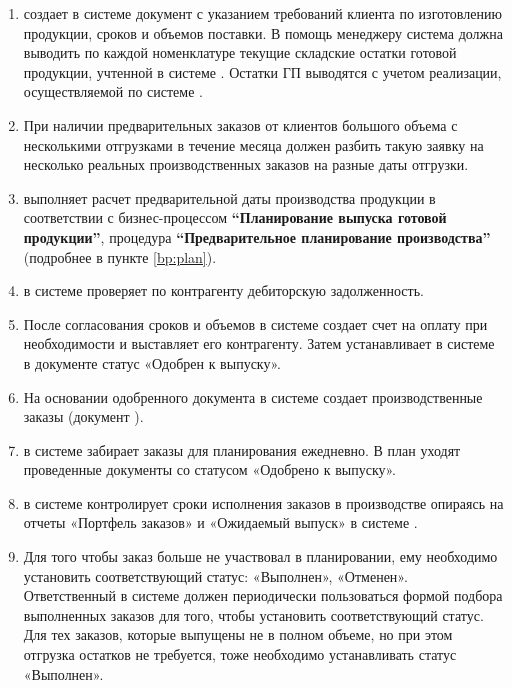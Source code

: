 \begin{enumerate}
\item \manager  создает в системе \gofro документ  с указанием требований клиента по изготовлению продукции, сроков и объемов поставки. В помощь менеджеру система \gofro должна выводить по каждой номенклатуре текущие складские остатки готовой продукции, учтенной в системе \gofro. Остатки ГП выводятся с учетом реализации, осуществляемой по системе \gofro. 


\item	При наличии предварительных заказов от клиентов большого объема с несколькими отгрузками в течение месяца \manager должен разбить такую заявку на несколько реальных производственных заказов на разные даты отгрузки.
\item	\manager выполняет расчет предварительной даты производства продукции в соответствии с бизнес-процессом \textbf{“Планирование выпуска готовой продукции”}, процедура \textbf{“Предварительное планирование производства”} (подробнее в пункте \ref{bp:plan}).
\item	\manager в системе \unf проверяет по контрагенту дебиторскую задолженность.
\item	После согласования сроков и объемов \manager в системе \erp создает счет на оплату при необходимости и выставляет его контрагенту. Затем \manager устанавливает в системе \gofro в документе  статус «Одобрен к выпуску». 
\item	На основании одобренного документа  в системе \gofro{} \manager создает производственные заказы (документ ). 
\item	\planner в системе \gofro забирает заказы для планирования ежедневно. В план уходят проведенные документы  со статусом «Одобрено к выпуску».
\item	\manager в системе \gofro контролирует сроки исполнения заказов в производстве опираясь на отчеты «Портфель заказов» и «Ожидаемый выпуск» в системе \gofro.
\item	Для того чтобы заказ больше не участвовал в планировании, ему необходимо установить соответствующий статус: «Выполнен», «Отменен». Ответственный \manager в системе \gofro должен периодически пользоваться формой подбора выполненных заказов для того, чтобы установить соответствующий статус. Для тех заказов, которые выпущены не в полном объеме, но при этом отгрузка остатков не требуется, тоже необходимо устанавливать статус «Выполнен».
\end{enumerate}



